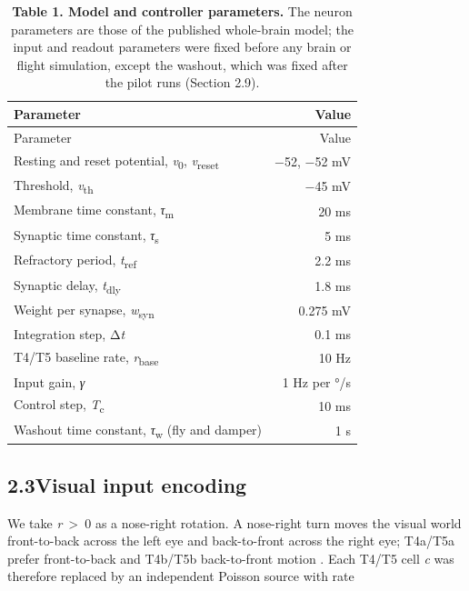\documentclass[11pt,letterpaper]{article}
\begin{document}
\protect{}\label{t-params}
\begin{longtable}[]{@{}lr@{}}
\caption{\textbf{Table 1. Model and controller parameters.} The neuron
parameters are those of the published whole-brain model; the input and
readout parameters were fixed before any brain or flight simulation,
except the washout, which was fixed after the pilot runs (Section
2.9).}\tabularnewline
\toprule\noalign{}
Parameter & Value \\
\midrule\noalign{}
\endfirsthead
\toprule\noalign{}
Parameter & Value \\
\midrule\noalign{}
\endhead
\bottomrule\noalign{}
\endlastfoot
Resting and reset potential, \emph{v}\textsubscript{0},
\emph{v}\textsubscript{reset} & −52, −52 mV \\
Threshold, \emph{v}\textsubscript{th} & −45 mV \\
Membrane time constant, \emph{τ}\textsubscript{m} & 20 ms \\
Synaptic time constant, \emph{τ}\textsubscript{s} & 5 ms \\
Refractory period, \emph{t}\textsubscript{ref} & 2.2 ms \\
Synaptic delay, \emph{t}\textsubscript{dly} & 1.8 ms \\
Weight per synapse, \emph{w}\textsubscript{syn} & 0.275 mV \\
Integration step, Δ\emph{t} & 0.1 ms \\
T4/T5 baseline rate, \emph{r}\textsubscript{base} & 10 Hz \\
Input gain, \emph{γ} & 1 Hz per °/s \\
Control step, \emph{T}\textsubscript{c} & 10 ms \\
Washout time constant, \emph{τ}\textsubscript{w} (fly and damper) & 1
s \\
\end{longtable}

\subsection{\texorpdfstring{2.3\quad Visual input
encoding}{2.3Visual input encoding}}\label{visual-input-encoding}

\noindent We take \emph{r}~\textgreater~0 as a nose-right rotation. A
nose-right turn moves the visual world front-to-back across the left eye
and back-to-front across the right eye; T4a/T5a prefer front-to-back and
T4b/T5b back-to-front motion \cite{maisak2013,shinomiya2019}. Each T4/T5
cell \emph{c} was therefore replaced by an independent Poisson source
with rate
\end{document}
